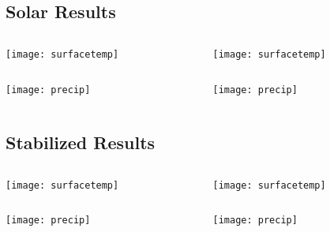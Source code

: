 \documentclass{beamer}
\begin{document}
\subsection{Solar Results}
\begin{frame}
\begin{columns}
\begin{column}{4cm}\centering
	\texttt{[image: surfacetemp]}
\end{column}
\begin{column}{4cm}\centering
	\texttt{[image: surfacetemp]}
\end{column}
\end{columns}
\begin{columns}
\begin{column}{4cm}\centering
	\texttt{[image: precip]}
\end{column}
\begin{column}{4cm}\centering
	\texttt{[image: precip]}
\end{column}
\end{columns}
\end{frame}

\subsection{Stabilized Results}
\begin{frame}
\begin{columns}
\begin{column}{4cm}\centering
	\texttt{[image: surfacetemp]}
\end{column}
\begin{column}{4cm}\centering
	\texttt{[image: surfacetemp]}
\end{column}
\end{columns}
\begin{columns}
\begin{column}{4cm}\centering
	\texttt{[image: precip]}
\end{column}
\begin{column}{4cm}\centering
	\texttt{[image: precip]}
\end{column}
\end{columns}
\end{frame}
\end{document}
